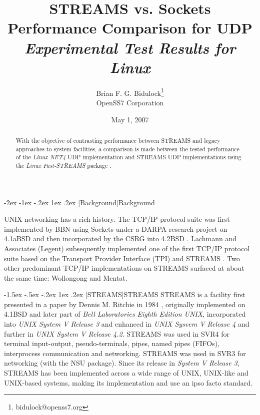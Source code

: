 \documentclass[letterpaper,final,notitlepage,twocolumn,10pt,twoside]{article}
\makeatletter
\renewcommand\section{\@startsection {section}{1}{\z@}%
                                   {-2ex \@plus -1ex \@minus -.2ex}%
                                   {1ex \@plus .2ex}%
                                   {\normalfont\large\bfseries}}
\renewcommand\subsection{\@startsection{subsection}{2}{\z@}%
                                     {-1.5ex \@plus -.5ex \@minus -.2ex}%
                                     {1ex \@plus .2ex}%
                                     {\normalfont\normalsize\bfseries}}
\makeatother
\begin{document}

\title{STREAMS vs. Sockets Performance Comparison for UDP\\[0.5ex]
	{\large \textsl{Experimental Test Results for Linux}}}
\author{Brian F. G. Bidulock\thanks{bidulock@openss7.org}\\
	OpenSS7 Corporation}
\date{May 1, 2007}
\maketitle

\begin{abstract}
With the objective of contrasting performance between STREAMS and legacy
approaches to system facilities, a comparison is made between the tested
performance of the \textsl{Linux NET4} UDP implementation and STREAMS UDP
implementations using the \textsl{Linux Fast-STREAMS}
package \cite[]{LfS}.
\end{abstract}


\section[Background]{Background}

UNIX networking has a rich history.  The TCP/IP protocol suite was first
implemented by BBN using Sockets under a DARPA research project on 4.1aBSD and
then incorporated by the CSRG into 4.2BSD \cite[]{bsd}.  Lachmann and
Associates (Legent) subsequently implemented one of the first TCP/IP protocol
suite based on the Transport Provider Interface (TPI) \cite[]{tli} and STREAMS
\cite[]{magic}.  Two other predominant TCP/IP implementations on STREAMS
surfaced at about the same time: Wollongong and Mentat.

\subsection[STREAMS]{STREAMS}
STREAMS is a facility first presented in a paper by Dennis M. Ritchie in 1984
\cite[]{Ritchie84}, originally implemented on 4.1BSD and later part of
\textsl{Bell Laboratories Eighth Edition UNIX}, incorporated into \textsl{UNIX
System V Release 3} and enhanced in \textsl{UNIX Sysvem V Release 4} and
further in \textsl{UNIX System V Release 4.2}.  STREAMS was used in SVR4 for
terminal input-output, pseudo-terminals, pipes, named pipes (FIFOs),
interprocess communication and networking.  STREAMS was used in SVR3 for
networking (with the NSU package).  Since its release in \textsl{System V
Release 3}, STREAMS has been implemented across a wide range of UNIX,
UNIX-like and UNIX-based systems, making its implementation and use an ipso
facto standard.
\end{document}
